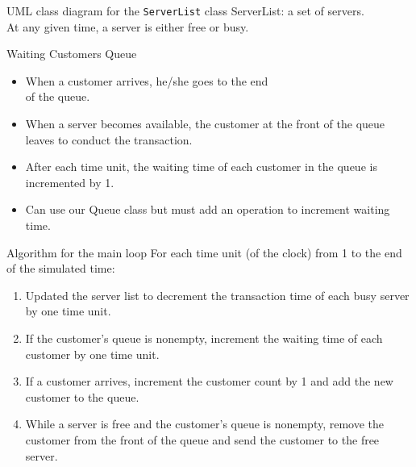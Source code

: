 \documentclass[14pt,aspectratio=1610]{beamer}
\begin{document}
\begin{frame}{UML class diagram for the \texttt{ServerList} class}
  ServerList: a set of servers.\\
  At any given time, a server is either free or busy.

  \center%
  \renewcommand{\umlfillcolor}{CSUblue!80!black}
  \renewcommand{\umldrawcolor}{white}
  \renewcommand{\umltextcolor}{white}
\end{frame}

\begin{frame}{Waiting Customers Queue}
  \begin{itemize}
    \item 
      When a customer arrives, he/she goes to the end\\ of the queue.
    \item 
      When a server becomes available, the customer at the front of the queue leaves to conduct the transaction.
    \item 
      After each time unit, the waiting time of each customer in the queue is incremented by 1.
    \item 
      Can use our Queue class but must add an operation to increment waiting time.
  \end{itemize}
\end{frame}

\begin{frame}{Algorithm for the main loop}
  For each time unit (of the clock) from 1 to the end\\ of the simulated time:
  \begin{enumerate}
    \item 
      Updated the server list to decrement the transaction time of each busy server by one time unit.
    \item 
      If the customer's queue is nonempty, increment the waiting time of each customer by one time unit.
    \item 
      If a customer arrives, increment the customer count by 1 and add the new customer to the queue.
    \item 
      While a server is free and the customer's queue is nonempty, remove the customer from the front of the queue and send the customer to the free server.
  \end{enumerate}
\end{frame}
\end{document}
